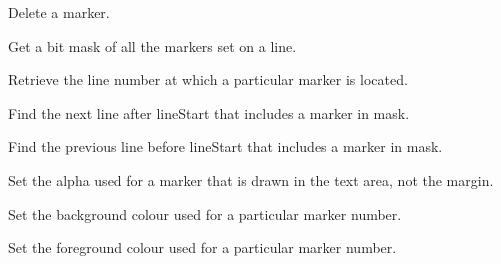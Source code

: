 
Delete a marker.


\label{wxstyledtextctrlmarkerget}


Get a bit mask of all the markers set on a line.


\label{wxstyledtextctrlmarkerlinefromhandle}


Retrieve the line number at which a particular marker is located.


\label{wxstyledtextctrlmarkernext}


Find the next line after lineStart that includes a marker in mask.


\label{wxstyledtextctrlmarkerprevious}


Find the previous line before lineStart that includes a marker in mask.


\label{wxstyledtextctrlmarkersetalpha}


Set the alpha used for a marker that is drawn in the text area, not the margin.


\label{wxstyledtextctrlmarkersetbackground}


Set the background colour used for a particular marker number.


\label{wxstyledtextctrlmarkersetforeground}


Set the foreground colour used for a particular marker number.


